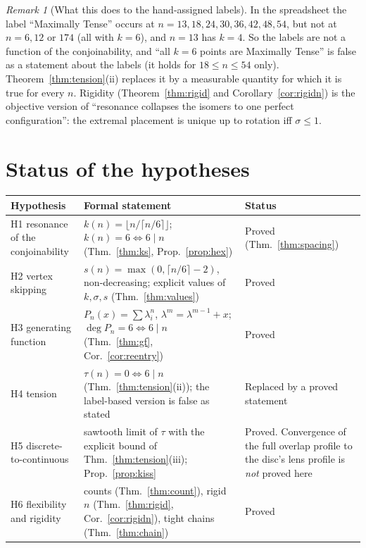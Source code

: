 \documentclass[11pt,a4paper]{article}
\theoremstyle{definition}
\theoremstyle{remark}
\newtheorem{remark}[theorem]{Remark}
\begin{document}
\begin{remark}[What this does to the hand-assigned labels]
In the spreadsheet the label ``Maximally Tense'' occurs at $n=13,18,24,30,36,42,48,54$, but not at $n=6,12$ or $174$ (all with $k=6$), and $n=13$ has $k=4$. So the labels are not a function of the conjoinability, and ``all $k=6$ points are Maximally Tense'' is false as a statement about the labels (it holds for $18\le n\le54$ only). Theorem~\ref{thm:tension}(ii) replaces it by a measurable quantity for which it is true for every $n$.
Rigidity (Theorem~\ref{thm:rigid} and Corollary~\ref{cor:rigidn}) is the objective version of ``resonance collapses the isomers to one perfect configuration'': the extremal placement is unique up to rotation iff $\sigma\le1$.
\end{remark}

\section{Status of the hypotheses}\label{sec:status}

\begin{center}
\small
\begin{tabular}{p{3.0cm}p{6.2cm}p{5.2cm}}
\toprule
Hypothesis & Formal statement & Status\\
\midrule
H1 resonance of the conjoinability & $k(n)=\lfloor n/\lceil n/6\rceil\rfloor$; $k(n)=6\iff6\mid n$ (Thm.~\ref{thm:ks}, Prop.~\ref{prop:hex}) & Proved (Thm.~\ref{thm:spacing})\\
H2 vertex skipping & $s(n)=\max(0,\lceil n/6\rceil-2)$, non-decreasing; explicit values of $k,\sigma,s$ (Thm.~\ref{thm:values}) & Proved\\
H3 generating function & $P_n(x)=\sum\lambda_i^n$, $\lambda^m=\lambda^{m-1}+x$; $\deg P_n=6\iff6\mid n$ (Thm.~\ref{thm:gf}, Cor.~\ref{cor:reentry}) & Proved\\
H4 tension & $\tau(n)=0\iff6\mid n$ (Thm.~\ref{thm:tension}(ii)); the label-based version is false as stated & Replaced by a proved statement\\
H5 discrete-to-continuous & sawtooth limit of $\tau$ with the explicit bound of Thm.~\ref{thm:tension}(iii); Prop.~\ref{prop:kiss} & Proved. Convergence of the full overlap profile to the disc's lens profile is \emph{not} proved here\\
H6 flexibility and rigidity & counts (Thm.~\ref{thm:count}), rigid $n$ (Thm.~\ref{thm:rigid}, Cor.~\ref{cor:rigidn}), tight chains (Thm.~\ref{thm:chain}) & Proved\\
\bottomrule
\end{tabular}
\end{center}
\end{document}
